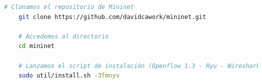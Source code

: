 \begin{lstlisting}[language= bash, style=Consola2, caption={Instalación de la herramienta Mininet},label=code:Mininet_install]
    # Clonamos el repositorio de Mininet
    git clone https://github.com/davidcawork/mininet.git

    # Accedemos al directorio
    cd mininet

    # Lanzamos el script de instalación (Openflow 1.3 - Ryu - Wireshark dissector)
    sudo util/install.sh -3fmnyv
\end{lstlisting}
\vspace{1cm}


